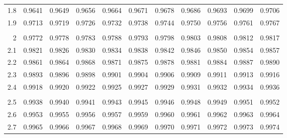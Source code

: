 \begin{center}
\begin{tabular}{r|rrrrrrrrrr}
       1.8 &     0.9641 &     0.9649 &     0.9656 &     0.9664 &     0.9671 &     0.9678 &     0.9686 &     0.9693 &     0.9699 &     0.9706 \\

       1.9 &     0.9713 &     0.9719 &     0.9726 &     0.9732 &     0.9738 &     0.9744 &     0.9750 &     0.9756 &     0.9761 &     0.9767 \\

           &            &            &            &            &            &            &            &            &            &            \\

         2 &     0.9772 &     0.9778 &     0.9783 &     0.9788 &     0.9793 &     0.9798 &     0.9803 &     0.9808 &     0.9812 &     0.9817 \\

       2.1 &     0.9821 &     0.9826 &     0.9830 &     0.9834 &     0.9838 &     0.9842 &     0.9846 &     0.9850 &     0.9854 &     0.9857 \\

       2.2 &     0.9861 &     0.9864 &     0.9868 &     0.9871 &     0.9875 &     0.9878 &     0.9881 &     0.9884 &     0.9887 &     0.9890 \\

       2.3 &     0.9893 &     0.9896 &     0.9898 &     0.9901 &     0.9904 &     0.9906 &     0.9909 &     0.9911 &     0.9913 &     0.9916 \\

       2.4 &     0.9918 &     0.9920 &     0.9922 &     0.9925 &     0.9927 &     0.9929 &     0.9931 &     0.9932 &     0.9934 &     0.9936 \\

           &            &            &            &            &            &            &            &            &            &            \\

       2.5 &     0.9938 &     0.9940 &     0.9941 &     0.9943 &     0.9945 &     0.9946 &     0.9948 &     0.9949 &     0.9951 &     0.9952 \\

       2.6 &     0.9953 &     0.9955 &     0.9956 &     0.9957 &     0.9959 &     0.9960 &     0.9961 &     0.9962 &     0.9963 &     0.9964 \\

       2.7 &     0.9965 &     0.9966 &     0.9967 &     0.9968 &     0.9969 &     0.9970 &     0.9971 &     0.9972 &     0.9973 &     0.9974 \\


\end{tabular}
\end{center}
